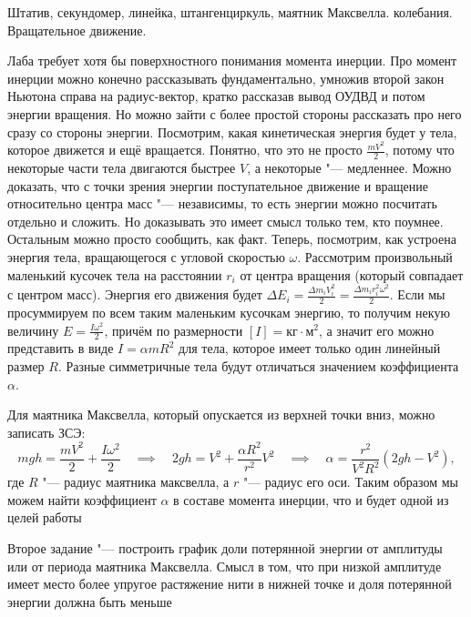 \begin{enumerate}
		{Штатив, секундомер, линейка, штангенциркуль, маятник Максвелла.}
		{колебания. Вращательное движение.}
		{\item Лаба требует хотя бы поверхностного понимания момента инерции. Про момент инерции можно конечно рассказывать фундаментально, умножив второй закон Ньютона справа на радиус-вектор, кратко рассказав вывод ОУДВД и потом энергии вращения. Но можно зайти с более простой стороны рассказать про него сразу со стороны энергии. Посмотрим, какая кинетическая энергия будет у тела, которое движется и ещё вращается. Понятно, что это не просто $\frac{mV^2}{2}$, потому что некоторые части тела двигаются быстрее $V$, а некоторые "--- медленнее. Можно доказать, что с точки зрения энергии поступательное движение и вращение относительно центра масс "--- независимы, то есть энергии можно посчитать отдельно и сложить. Но доказывать это имеет смысл только тем, кто поумнее. Остальным можно просто сообщить, как факт. Теперь, посмотрим, как устроена энергия тела, вращающегося с угловой скоростью $\omega$. Рассмотрим произвольный маленький кусочек тела на расстоянии $r_i$ от центра вращения (который совпадает с центром масс). Энергия его движения будет $\Delta E_i = \frac{\Delta m_i V_i^2}{2} = \frac{\Delta m_i r_i^2 \omega^2}{2}$. Если мы просуммируем по всем таким маленьким кусочкам энергию, то получим некую величину $E=\frac{I\omega^2}{2}$, причём по размерности $[I] = \text{кг}\cdot\text{м}^2$, а значит его можно представить в виде $I=\alpha mR^2$ для тела, которое имеет только один линейный размер $R$. Разные симметричные тела будут отличаться значением коэффициента $\alpha$.
        \item Для маятника Максвелла, который опускается из верхней точки вниз, можно записать ЗСЭ:
        \begin{equation*}
            mgh = \frac{mV^2}{2} + \frac{I\omega^2}{2} \quad \implies \quad 2gh = V^2 + \frac{\alpha R^2}{r^2}V^2 \quad \implies \quad \alpha = \frac{r^2}{V^2R^2}(2gh - V^2),
        \end{equation*}
        где $R$ "--- радиус маятника максвелла, а $r$ "--- радиус его оси. Таким образом мы можем найти коэффициент $\alpha$ в составе момента инерции, что и будет одной из целей работы
        \item Второе задание "--- построить график доли потерянной энергии от амплитуды или от периода маятника Максвелла. Смысл в том, что при низкой амплитуде имеет место более упругое растяжение нити в нижней точке и доля потерянной энергии должна быть меньше
        }
	\item \labtitle

\end{enumerate}
